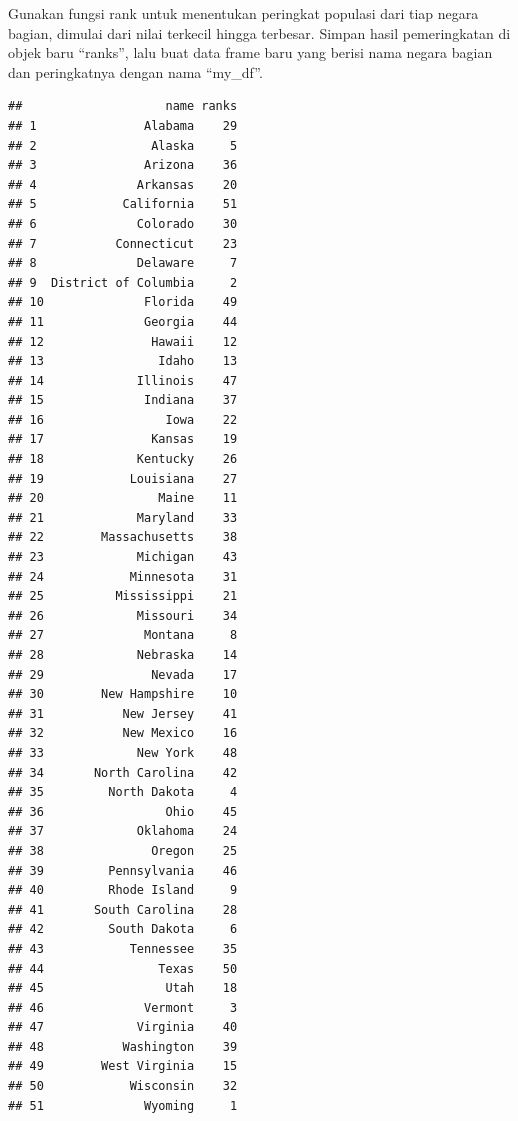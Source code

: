 \documentclass[
]{article}
\newenvironment{Shaded}{\begin{snugshade}}{\end{snugshade}}
\newcommand{\AttributeTok}[1]{\textcolor[rgb]{0.77,0.63,0.00}{#1}}
\newcommand{\FunctionTok}[1]{\textcolor[rgb]{0.00,0.00,0.00}{#1}}
\newcommand{\NormalTok}[1]{#1}
\newcommand{\OtherTok}[1]{\textcolor[rgb]{0.56,0.35,0.01}{#1}}
\newcommand{\SpecialCharTok}[1]{\textcolor[rgb]{0.00,0.00,0.00}{#1}}
\begin{document}
Gunakan fungsi rank untuk menentukan peringkat populasi dari tiap negara
bagian, dimulai dari nilai terkecil hingga terbesar. Simpan hasil
pemeringkatan di objek baru ``ranks'', lalu buat data frame baru yang
berisi nama negara bagian dan peringkatnya dengan nama ``my\_df''.

\begin{Shaded}
\end{Shaded}

\begin{verbatim}
##                    name ranks
## 1               Alabama    29
## 2                Alaska     5
## 3               Arizona    36
## 4              Arkansas    20
## 5            California    51
## 6              Colorado    30
## 7           Connecticut    23
## 8              Delaware     7
## 9  District of Columbia     2
## 10              Florida    49
## 11              Georgia    44
## 12               Hawaii    12
## 13                Idaho    13
## 14             Illinois    47
## 15              Indiana    37
## 16                 Iowa    22
## 17               Kansas    19
## 18             Kentucky    26
## 19            Louisiana    27
## 20                Maine    11
## 21             Maryland    33
## 22        Massachusetts    38
## 23             Michigan    43
## 24            Minnesota    31
## 25          Mississippi    21
## 26             Missouri    34
## 27              Montana     8
## 28             Nebraska    14
## 29               Nevada    17
## 30        New Hampshire    10
## 31           New Jersey    41
## 32           New Mexico    16
## 33             New York    48
## 34       North Carolina    42
## 35         North Dakota     4
## 36                 Ohio    45
## 37             Oklahoma    24
## 38               Oregon    25
## 39         Pennsylvania    46
## 40         Rhode Island     9
## 41       South Carolina    28
## 42         South Dakota     6
## 43            Tennessee    35
## 44                Texas    50
## 45                 Utah    18
## 46              Vermont     3
## 47             Virginia    40
## 48           Washington    39
## 49        West Virginia    15
## 50            Wisconsin    32
## 51              Wyoming     1
\end{verbatim}
\end{document}
